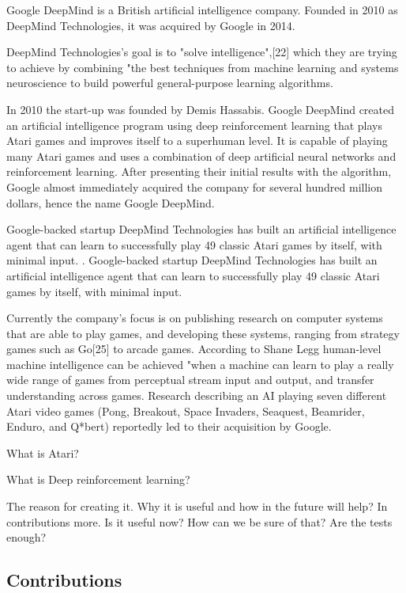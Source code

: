 \documentclass{article}
\begin{document}
Google DeepMind is a British artificial intelligence company. Founded in 2010 as DeepMind Technologies, it was acquired by Google in 2014. 

DeepMind Technologies's goal is to "solve intelligence",[22] which they are trying to achieve by combining "the best techniques from machine learning and systems neuroscience to build powerful general-purpose learning algorithms.

In 2010 the start-up was founded by Demis Hassabis.
Google DeepMind created an artificial intelligence program using deep reinforcement learning that plays Atari games and improves itself to a superhuman level. It is capable of playing many Atari games and uses a combination of deep artificial neural networks and reinforcement learning. After presenting their initial results with the algorithm, Google almost immediately acquired the company for several hundred million dollars, hence the name Google DeepMind. 

Google-backed startup DeepMind Technologies has built an artificial intelligence agent that can learn to successfully play 49 classic Atari games by itself, with minimal input. \cite{liatClark}. Google-backed startup DeepMind Technologies has built an artificial intelligence agent that can learn to successfully play 49 classic Atari games by itself, with minimal input.

Currently the company's focus is on publishing research on computer systems that are able to play games, and developing these systems, ranging from strategy games such as Go[25] to arcade games. According to Shane Legg human-level machine intelligence can be achieved "when a machine can learn to play a really wide range of games from perceptual stream input and output, and transfer understanding across games. Research describing an AI playing seven different Atari video games (Pong, Breakout, Space Invaders, Seaquest, Beamrider, Enduro, and Q*bert) reportedly led to their acquisition by Google.


What is Atari?

What is Deep reinforcement learning?

The reason for creating it. Why it is useful and how in the future will help? In contributions more.
Is it useful now? How can we be sure of that? Are the tests enough?

\cite{liamThung}

\vspace{12pt}
 
\subsection*{{ {\textbf{Contributions}}}}
\end{document}
